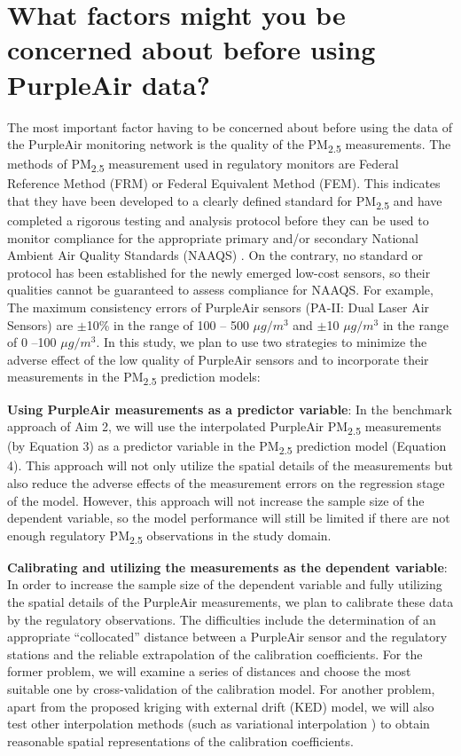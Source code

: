 \documentclass[11pt]{article}
\newcommand{\tsub}{\textsubscript}
\begin{document}
\section{What factors might you be concerned about before using PurpleAir data?}
The most important factor having to be concerned about before using the data of the PurpleAir monitoring network is the quality of the PM\tsub{2.5} measurements. The methods of PM\tsub{2.5} measurement used in regulatory monitors are Federal Reference Method (FRM) or Federal Equivalent Method (FEM). This indicates that they have been developed to a clearly defined standard for PM\tsub{2.5} and have completed a rigorous testing and analysis protocol before they can be used to monitor compliance for the appropriate primary and/or secondary National Ambient Air Quality Standards (NAAQS) \citep{hall2014integrating}. On the contrary, no standard or protocol has been established for the newly emerged low-cost sensors, so their qualities cannot be guaranteed to assess compliance for NAAQS. For example, The maximum consistency errors of PurpleAir sensors (PA-II: Dual Laser Air Sensors) are $\pm$10\% in the range of 100 -- 500 $\mu g/m^3$ and $\pm$10 $\mu g/m^3$ in the range of 0 --100 $\mu g/m^3$. In this study, we plan to use two strategies to minimize the adverse effect of the low quality of PurpleAir sensors and to incorporate their measurements in the PM\tsub{2.5} prediction models:
\begin{enumerate*}[{[1)]}]
    \item \textbf{Using PurpleAir measurements as a predictor variable}: In the benchmark approach of Aim 2, we will use the interpolated PurpleAir PM\tsub{2.5} measurements (by Equation 3) as a predictor variable in the PM\tsub{2.5} prediction model (Equation 4). This approach will not only utilize the spatial details of the measurements but also reduce the adverse effects of the measurement errors on the regression stage of the model. However, this approach will not increase the sample size of the dependent variable, so the model performance will still be limited if there are not enough regulatory PM\tsub{2.5} observations in the study domain. 
    \item \textbf{Calibrating and utilizing the measurements as the dependent variable}: In order to increase the sample size of the dependent variable and fully utilizing the spatial details of the PurpleAir measurements, we plan to calibrate these data by the regulatory observations. The difficulties include the determination of an appropriate ``collocated'' distance between a PurpleAir sensor and the regulatory stations and the reliable extrapolation of the calibration coefficients. For the former problem, we will examine a series of distances and choose the most suitable one by cross-validation of the calibration model. For another problem, apart from the proposed kriging with external drift (KED) model, we will also test other interpolation methods (such as variational interpolation \citep{turk1999shape}) to obtain reasonable spatial representations of the calibration coefficients. 
\end{enumerate*}
\end{document}
